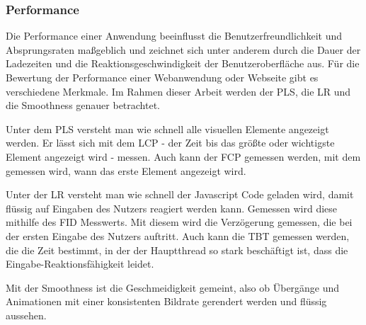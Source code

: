 \subsubsection{Performance}\label{sec:PerformanceBasics}
Die Performance einer Anwendung beeinflusst die Benutzerfreundlichkeit und Absprungsraten maßgeblich und zeichnet sich unter anderem durch die Dauer der Ladezeiten und die Reaktionsgeschwindigkeit der Benutzeroberfläche aus. Für die Bewertung der Performance einer Webanwendung oder Webseite gibt es verschiedene Merkmale. Im Rahmen dieser Arbeit werden der \ac{PLS}, die \ac{LR} und die Smoothness genauer betrachtet. 

Unter dem \ac{PLS} versteht man wie schnell alle visuellen Elemente angezeigt werden. Er lässt sich mit dem \ac{LCP} - der Zeit bis das größte oder wichtigste Element angezeigt wird - messen. Auch kann der \ac{FCP} gemessen werden, mit dem gemessen wird, wann das erste Element angezeigt wird.

Unter der \ac{LR} versteht man wie schnell der Javascript Code geladen wird, damit flüssig auf Eingaben des Nutzers reagiert werden kann. Gemessen wird diese mithilfe des \ac{FID} Messwerts. Mit diesem wird die Verzögerung gemessen, die bei der ersten Eingabe des Nutzers auftritt. Auch kann die \ac{TBT} gemessen werden, die die Zeit bestimmt, in der der Hauptthread so stark beschäftigt ist, dass die Eingabe-Reaktionsfähigkeit leidet.

Mit der Smoothness ist die Geschmeidigkeit gemeint, also ob Übergänge und Animationen mit einer konsistenten Bildrate gerendert werden und flüssig aussehen.
